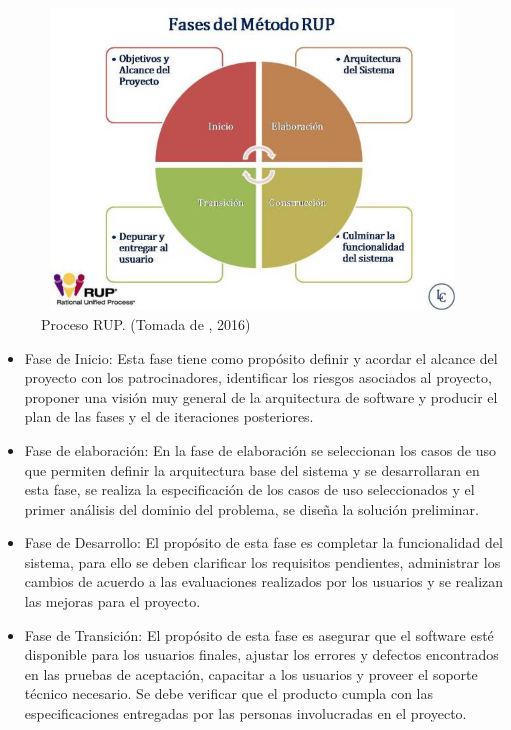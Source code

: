 \begin{figure}[H]
\begin{center}
	\includegraphics[width=13cm,height=8cm]{img/fases-rup.jpg}
\end{center}
\caption{Proceso RUP. (Tomada de \citet{dtyocbib} , 2016)}
\label{fig:Rup}
\end{figure}



\begin{itemize}

    \item Fase de Inicio: Esta fase tiene como propósito definir y acordar el alcance del proyecto con los patrocinadores, identificar los riesgos asociados al proyecto, proponer una visión muy general de la arquitectura de software y producir el plan de las fases y el de iteraciones posteriores.

	\item Fase de elaboración: En la fase de elaboración se seleccionan los casos de uso que permiten definir la arquitectura base del sistema y se desarrollaran en esta fase, se realiza la especificación de los casos de uso seleccionados y el primer análisis del dominio del problema, se diseña la solución preliminar.

	\item Fase de Desarrollo: El propósito de esta fase es completar la funcionalidad del sistema, para ello se deben clarificar los requisitos pendientes, administrar los cambios de acuerdo a las evaluaciones realizados por los usuarios y se realizan las mejoras para el proyecto.

	\item Fase de Transición: El propósito de esta fase es asegurar que el software esté disponible para los usuarios finales, ajustar los errores y defectos encontrados en las pruebas de aceptación, capacitar a los usuarios y proveer el soporte técnico necesario. Se debe verificar que el producto cumpla con las especificaciones entregadas por las personas involucradas en el proyecto.	

\end{itemize}

